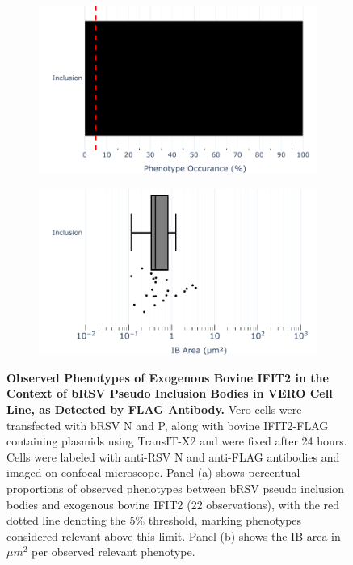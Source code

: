 \begin{figure}
    \begin{subfigure}{0.495\textwidth}
        \caption{}
        \includegraphics[width=1\linewidth]{08. Chapter 3/Figs/03. pIB/03. IFIT2/04. IFIT2-FLAG/03. FLAG/07. bar_bi2f_bnbp.pdf} 
    \end{subfigure}
    \begin{subfigure}{0.495\textwidth}
        \caption{}
        \includegraphics[width=1\linewidth]{08. Chapter 3/Figs/03. pIB/03. IFIT2/04. IFIT2-FLAG/03. FLAG/08. box_bi2f_bnbp.pdf}
    \end{subfigure}
    \caption[Observed Phenotypes of Exogenous Bovine IFIT2 in the Context of bRSV Pseudo Inclusion Bodies in VERO Cell Line, as Detected by FLAG Antibody.]{\textbf{Observed Phenotypes of Exogenous Bovine IFIT2 in the Context of bRSV Pseudo Inclusion Bodies in VERO Cell Line, as Detected by FLAG Antibody.} Vero cells were transfected with bRSV N and P, along with bovine IFIT2-FLAG containing plasmids using TransIT-X2 and were fixed after 24 hours. Cells were labeled with anti-RSV N and anti-FLAG antibodies and imaged on confocal microscope. Panel (a) shows percentual proportions of observed phenotypes between bRSV pseudo inclusion bodies and exogenous bovine IFIT2 (22 observations), with the red dotted line denoting the 5\% threshold, marking phenotypes considered relevant above this limit. Panel (b) shows the IB area in \(\mu m^2\) per observed relevant phenotype.}
    \label{fig:Observed Phenotypes of Exogenous Bovine IFIT2 in the Context of bRSV Pseudo Inclusion Bodies in VERO Cell Line, as Detected by FLAG Antibody}
\end{figure}

